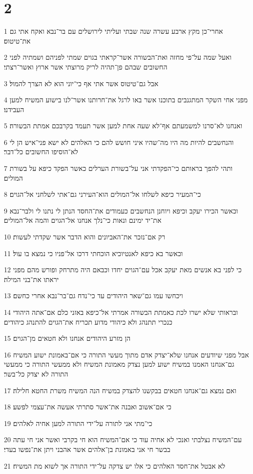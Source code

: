 \chapter{2}

\par 1 אחרי־כן מקץ ארבע עשרה שנה שבתי ועליתי לירושלים עם בר־נבא ואקח אתי גם את־טיטוס׃
\par 2 ואעל שמה על־פי מחזה ואת־הבשורה אשר־קראתי בגוים שמתי לפניהם ושמתיה לפני החשובים שבהם פן־תהיה לריק מרוצתי אשר ארוץ ואשר־רצתי׃
\par 3 אבל גם־טיטוס אשר אתי אף כי־יוני הוא לא הצרך להמול׃
\par 4 מפני אחי השקר המתגנבים בתוכנו אשר באו לרגל את־חרותנו אשר־לנו בישוע המשיח למען העבידנו׃
\par 5 ואנחנו לא־סרנו למשמעתם אף־לא שעה אחת למען אשר תעמד בקרבכם אמתת הבשורה׃
\par 6 והנחשבים להיות מה היו מה־שהיו איני חושש להם כי האלהים לא ישא פני־איש הן לי לא־הוסיפו החשובים כל־דבר׃
\par 7 ותהי להפך בראותם כי־הפקדתי אני על־בשורת הערלים כאשר הפקד כיפא על בשורת המולים׃
\par 8 כי־המעיר כיפא לשלחו אל־המולים הוא־העירני גם־אתי לשלחני אל־הגוים׃
\par 9 וכאשר הכירו יעקב וכיפא ויוחנן הנחשבים כעמודים את־החסד הנתן לי נתנו לי ולבר־נבא את־יד ימינם ונאות כי־נלך אנחנו אל־הגוים והמה אל־המולים׃
\par 10 רק אם־נזכר את־האביונים והוא הדבר אשר שקדתי לעשות׃
\par 11 וכאשר בא כיפא לאנטיוכיא הוכחתי דרכו אל־פניו כי נמצא בו עול׃
\par 12 כי לפני בא אנשים מאת יעקב אכל עם־הגוים יחדו וכבאם היה מתרחק ופורש מהם מפני יראתו את־בני המילה׃
\par 13 ויכחשו עמו גם־שאר היהודים עד כי־נדח גם־בר־נבא אחרי כחשם׃
\par 14 ובראותי שלא ישרו לכת כאמתת הבשורה אמרתי אל־כיפא באזני כלם אם־אתה היהודי כנכרי תתנהג ולא כיהודי מדוע תכריח את־הגוים להתנהג כיהודים׃
\par 15 הן מזרע היהודים אנחנו ולא חטאים מן־הגוים׃
\par 16 אבל מפני שיודעים אנחנו שלא־יצדק אדם מתוך מעשי התורה כי אם־באמונת ישוע המשיח גם־אנחנו האמנו במשיח ישוע למען נצדק מאמונת המשיח ולא ממעשי התורה כי ממעשי התורה לא יצדק כל־בשר׃
\par 17 ואם נמצא גם־אנחנו חטאים בבקשנו להצדק במשיח הנה המשיח משרת החטא חלילה׃
\par 18 כי אם־אשוב ואבנה את־אשר סתרתי אעשה את־עצמי לפשע׃
\par 19 כי־מתי אני לתורה על־ידי התורה למען אחיה לאלהים׃
\par 20 עם־המשיח נצלבתי ואנכי לא אחיה עוד כי אם־המשיח הוא חי בקרבי ואשר אני חי עתה בבשר חי אני באמונת בן־אלהים אשר אהבני ויתן את־נפשו בעדי׃
\par 21 לא אבטל את־חסד האלהים כי אלו יש צדקה על־ידי התורה אך לשוא מת המשיח׃

